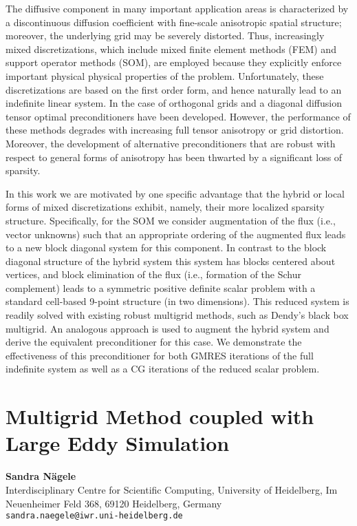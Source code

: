 \documentclass[11pt]{article}
\newcommand{\nextab}[4]{
	\section{#2}
	{\bf #1} \\ \nopagebreak
	{#3} \\ \nopagebreak
	{\tt #4} \nopagebreak
	}
\begin{document}
The diffusive component in many important application areas is
characterized by a discontinuous diffusion coefficient with fine-scale
anisotropic spatial structure; moreover, the underlying grid may be
severely distorted.  Thus, increasingly mixed discretizations, which
include mixed finite element methods (FEM) and support operator
methods (SOM), are employed because they explicitly enforce important
physical physical properties of the problem.  Unfortunately, these
discretizations are based on the first order form, and hence naturally
lead to an indefinite linear system.  In the case of orthogonal grids
and a diagonal diffusion tensor optimal preconditioners have been
developed.  However, the performance of these methods degrades with
increasing full tensor anisotropy or grid distortion.  Moreover,
the development of alternative preconditioners that are robust
with respect to general forms of anisotropy has been thwarted by
a significant loss of sparsity.

In this work we are motivated by one specific advantage that the
hybrid or local forms of mixed discretizations exhibit, namely, their
more localized sparsity structure.  Specifically, for the SOM we
consider augmentation of the flux (i.e., vector unknowns) such that an
appropriate ordering of the augmented flux leads to a new block
diagonal system for this component.  In contrast to the block diagonal
structure of the hybrid system this system has blocks centered about
vertices, and block elimination of the flux (i.e., formation of the
Schur complement) leads to a symmetric positive definite scalar
problem with a standard cell-based 9-point structure (in two
dimensions).  This reduced system is readily solved with existing
robust multigrid methods, such as Dendy's black box multigrid.  An
analogous approach is used to augment the hybrid system and derive the
equivalent preconditioner for this case.  We demonstrate the
effectiveness of this preconditioner for both GMRES iterations of the
full indefinite system as well as a CG iterations of the reduced
scalar problem.




\nextab
{Sandra N\"agele}
{Multigrid Method coupled with Large Eddy Simulation}
{Interdisciplinary Centre for Scientific Computing, University of Heidelberg, Im Neuenheimer Feld 368, 69120 Heidelberg, Germany}
{sandra.naegele@iwr.uni-heidelberg.de}
\end{document}
